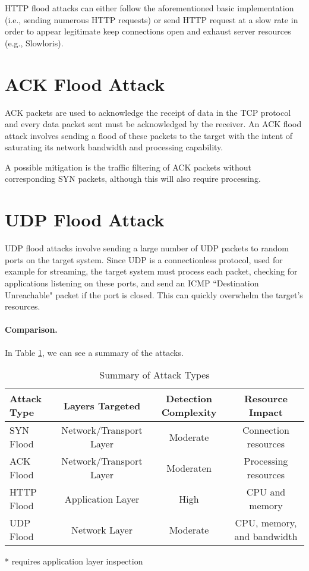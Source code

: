 HTTP flood attacks can either follow the aforementioned basic implementation (i.e., sending numerous HTTP requests) or send HTTP request at a slow rate in order to appear legitimate keep connections open and exhaust server resources (e.g., Slowloris).

\section{ACK Flood Attack}

ACK packets are used to acknowledge the receipt of data in the TCP protocol and every data packet sent must be acknowledged by the receiver. An ACK flood attack involves sending a flood of these packets to the target with the intent of saturating its network bandwidth and processing capability.

A possible mitigation is the traffic filtering of ACK packets without corresponding SYN packets, although this will also require processing.

\section{UDP Flood Attack}

UDP flood attacks involve sending a large number of UDP packets to random ports on the target system. Since UDP is a connectionless protocol, used for example for streaming, the target system must process each packet, checking for applications listening on these ports, and send an ICMP ``Destination Unreachable" packet if the port is closed. This can quickly overwhelm the target's resources.

\paragraph{Comparison.}

In Table \ref{tab:comparion}, we can see a summary of the attacks.

\begin{table}[h!]
	\centering
	\begin{threeparttable}
	\begin{tabular}{lccc}
		\toprule
		\textbf{Attack Type} & \textbf{Layers Targeted} & \textbf{Detection Complexity} & \textbf{Resource Impact} \\
		\midrule
		SYN Flood  & Network/Transport Layer & Moderate & Connection resources \\
		ACK Flood  & Network/Transport Layer & Moderaten  & Processing resources \\
		HTTP Flood & Application Layer & High \tnote{*} & CPU and memory \\
		UDP Flood  & Network Layer  & Moderate & CPU, memory, and bandwidth \\
		\bottomrule
	\end{tabular}
	\begin{tablenotes}
		\item[*] requires application layer inspection
	\end{tablenotes}
	\end{threeparttable}
	\caption{Summary of Attack Types}
	\label{tab:comparion}
\end{table}
